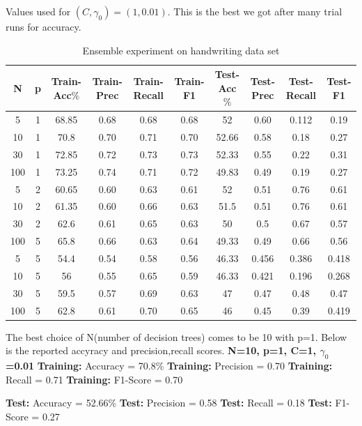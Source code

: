 \documentclass{article}
\begin{document}
  Values used for $(C,\gamma_0) = (1,0.01)$. This is the best we got after many trial runs for accuracy. \newline
 \begin{longtable}{c|c|c|c|c|c|c|c|c|c}
  \caption{Ensemble experiment on handwriting data set} \\
  \hline\hline
	  N & p & Train-Acc$\%$ & Train-Prec & Train-Recall & Train-F1 & Test-Acc$\%$ & Test-Prec & Test-Recall & Test-F1 \\[0.5ex]

  \hline
	 5 & 1 & 68.85 & 0.68 & 0.68 & 0.68 & 52 & 0.60 & 0.112 & 0.19 \\
	 10 & 1 & 70.8 & 0.70 & 0.71 & 0.70 & 52.66 & 0.58 & 0.18 & 0.27 \\
	 30 & 1 & 72.85 & 0.72 & 0.73 & 0.73 & 52.33 & 0.55 & 0.22 & 0.31 \\
	 100 & 1 & 73.25 & 0.74 & 0.71 & 0.72 & 49.83 & 0.49 & 0.19 & 0.27 \\
	 5 & 2 & 60.65 & 0.60 & 0.63 & 0.61 & 52 & 0.51 & 0.76 & 0.61 \\
	 10 & 2 & 61.35 & 0.60 & 0.66 & 0.63 & 51.5 & 0.51 & 0.76 & 0.61 \\
	 30 & 2 & 62.6 & 0.61 & 0.65 & 0.63 & 50 & 0.5 & 0.67 & 0.57 \\
	 100 & 5 & 65.8 & 0.66 & 0.63 & 0.64 & 49.33 & 0.49 & 0.66 & 0.56 \\
	 5 & 5 & 54.4 & 0.54 & 0.58 & 0.56 & 46.33 & 0.456 & 0.386 & 0.418 \\
	 10 & 5 & 56 & 0.55 & 0.65 & 0.59 & 46.33 & 0.421 & 0.196 & 0.268 \\
	 30 & 5 & 59.5 & 0.57 & 0.69 & 0.63 & 47 & 0.47 & 0.48 & 0.47 \\
	 100 & 5 & 62.8 & 0.61 & 0.70 & 0.65 & 46 & 0.45 & 0.39 & 0.419 \\ [0.5ex]
  \end{longtable}
  
   
   The best choice of N(number of decision trees) comes to be 10 with p=1. Below is the reported accyracy and precision,recall scores. \newline
     \textbf {N=10, p=1, C=1, $\gamma_0$=0.01} \newline
     \textbf {Training: } Accuracy = 70.8\% \newline
     \textbf {Training: } Precision = 0.70 \newline
     \textbf {Training: } Recall = 0.71 \newline
     \textbf {Training: } F1-Score = 0.70 \newline

     \textbf {Test: } Accuracy = 52.66\% \newline
     \textbf {Test: } Precision = 0.58 \newline
     \textbf {Test: } Recall = 0.18 \newline
     \textbf {Test: } F1-Score = 0.27 \newline
\end{document}
